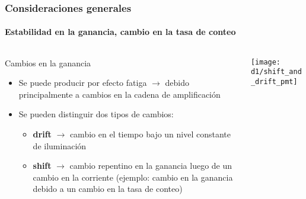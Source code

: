 \documentclass{beamer}
\begin{document}
\begin{frame}
\frametitle{Consideraciones generales}
\framesubtitle{Estabilidad en la ganancia, cambio en la tasa de conteo}
\begin{columns}
\begin{column}{0.60\textwidth}
\alert{Cambios en la ganancia}
\begin{itemize}
\item Se puede producir por efecto \alert{fatiga} $\rightarrow$ debido
principalmente a cambios en la cadena de amplificaci\'on
\item Se pueden distinguir dos tipos de cambios:
\begin{itemize}
\item \textbf{drift} $\rightarrow$ cambio en el tiempo bajo un nivel constante
de iluminaci\'on  
\item \textbf{shift} $\rightarrow$ cambio repentino en la ganancia luego de un
cambio en la corriente (ejemplo: cambio en la ganancia debido a un cambio en la
tasa de conteo)
\end{itemize}
\end{itemize}
\end{column} 
\begin{column}{0.40\textwidth}
\begin{center}
\texttt{[image: d1/shift\_and\_drift\_pmt]}
\end{center}
\end{column}
\end{columns}
\end{frame} 
\end{document}
